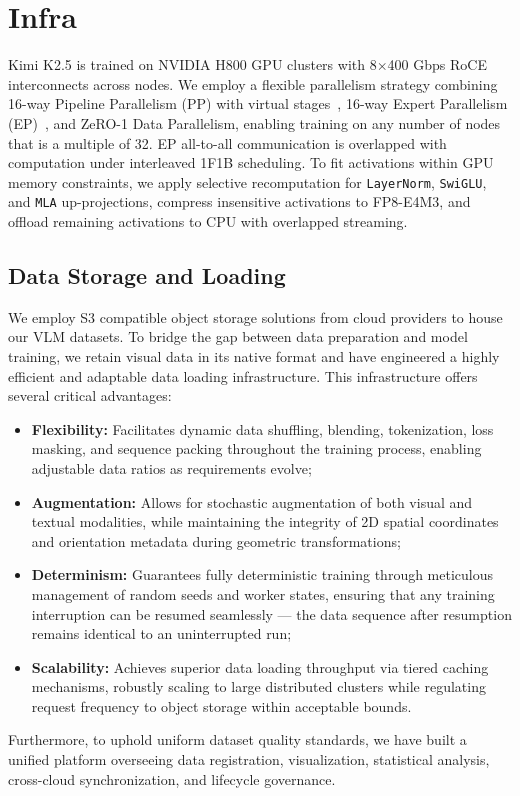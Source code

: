 \documentclass{article}
\newcommand{\citep}[1]{\parencite{#1}}
\begin{document}
\section{Infra}
Kimi K2.5 is trained on NVIDIA H800 GPU clusters with 8$\times$400 Gbps RoCE interconnects across nodes. We employ a flexible parallelism strategy combining 16-way Pipeline Parallelism (PP) with virtual stages~\citep{huang2019gpipeefficienttraininggiant,narayanan2021efficientlargescalelanguagemodel}, 16-way Expert Parallelism (EP)~\citep{lepikhin2020gshard}, and ZeRO-1 Data Parallelism, enabling training on any number of nodes that is a multiple of 32. EP all-to-all communication is overlapped with computation under interleaved 1F1B scheduling. To fit activations within GPU memory constraints, we apply selective recomputation for \texttt{LayerNorm}, \texttt{SwiGLU}, and \texttt{MLA} up-projections, compress insensitive activations to FP8-E4M3, and offload remaining activations to CPU with overlapped streaming.

\subsection{Data Storage and Loading}
We employ S3 \citep{amazon_s3} compatible object storage solutions from cloud providers to house our VLM datasets.
To bridge the gap between data preparation and model training, we retain visual data in its native format and have engineered a highly efficient and adaptable data loading infrastructure.
This infrastructure offers several critical advantages:
\begin{itemize}
\item \textbf{Flexibility:} Facilitates dynamic data shuffling, blending, tokenization, loss masking, and sequence packing throughout the training process, enabling adjustable data ratios as requirements evolve;
\item \textbf{Augmentation:} Allows for stochastic augmentation of both visual and textual modalities, while maintaining the integrity of 2D spatial coordinates and orientation metadata during geometric transformations;
\item \textbf{Determinism:} Guarantees fully deterministic training through meticulous management of random seeds and worker states, ensuring that any training interruption can be resumed seamlessly --- the data sequence after resumption remains identical to an uninterrupted run;
\item \textbf{Scalability:} Achieves superior data loading throughput via tiered caching mechanisms, robustly scaling to large distributed clusters while regulating request frequency to object storage within acceptable bounds.
\end{itemize}
Furthermore, to uphold uniform dataset quality standards, we have built a unified platform overseeing data registration, visualization, statistical analysis, cross-cloud synchronization, and lifecycle governance.
\end{document}
